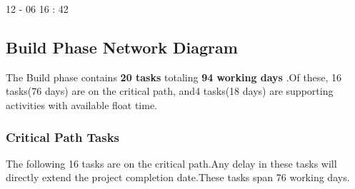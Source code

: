     12 -
    06 16 : 42 %

\subsection{Build Phase Network Diagram}

                 The Build phase contains \textbf{20 tasks} totaling \textbf{
                     94 working days}
                     .Of these,
    16 tasks(76 days) are on the critical path,
    and4 tasks(18 days) are supporting activities with available float time.

\vspace {
  0.5em
}

\subsubsection { Critical Path Tasks }

\noindent The following 16 tasks are on the critical
    path.Any delay in these tasks will directly extend the project completion
        date.These tasks span 76 working days.

\vspace {
  0.5em
}

